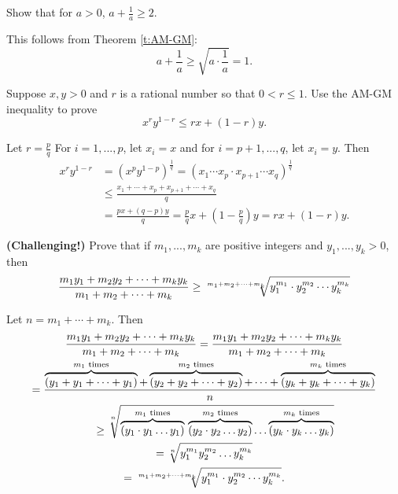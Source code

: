 \documentclass[11pt,dvipsnames]{book}
\numberwithin{figure}{section} %
\numberwithin{table}{section} %
\begin{document}
%
%

\begin{exercise} Show that for $a>0$, $a+\frac{1}{a}\geq 2$.
\begin{solution}
This follows from Theorem \ref{t:AM-GM}:
\[
a+\frac{1}{a} \geq \sqrt{a\cdot \frac{1}{a}}=1.
\]
\end{solution}
\end{exercise}

\begin{exercise} Suppose $x,y>0$ and $r$ is a rational number so that $0<r\leq 1$. Use the AM-GM inequality to prove
\[
x^{r}y^{1-r} \leq rx+(1-r)y.
\]
\begin{solution}
Let $r=\frac{p}{q}$ For $i=1,...,p$, let $x_i=x$ and for $i=p+1,...,q$, let $x_i=y$. Then
\begin{align*}
x^{r}y^{1-r}
& =(x^{p}y^{1-p})^{\frac{1}{q}}
=(x_{1}\cdots x_{p}\cdot x_{p+1}\cdots x_{q} )^{\frac{1}{q}}\\
& \leq \frac{x_{1}+\cdots + x_{p}+x_{p+1}+\cdots + x_{q}}{q} \\
& =\frac{px+(q-p)y}{q}=\frac{p}{q} x+(1-\frac{p}{q})y=rx+(1-r)y.
\end{align*}
\end{solution}

\end{exercise}



\begin{exercise} {\bf(Challenging!)} Prove that if $m_{1},...,m_{k}$ are positive integers and $y_{1},...,y_{k}>0$, then
\[
{m_1y_1+m_2y_2+\cdots+m_ky_k \over m_1+m_2+\cdots+m_k} \geq \sqrt[\large m_1+m_2+\cdots+m_k]{y_1^{m_1}\cdot y_2^{m_2}\cdots y_k^{m_k}}
\]

\begin{solution}
Let $n=m_{1}+\cdots + m_{k}$. Then
\begin{multline*}
{m_1y_1+m_2y_2+\cdots+m_ky_k \over m_1+m_2+\cdots+m_k}
=
{m_1y_1+m_2y_2+\cdots+m_ky_k \over m_1+m_2+\cdots+m_k} \\
=
\frac{\overbrace{(y_1+y_1+\dots+y_1)}^{m_1 \text{ times}}+\overbrace{(y_2+y_2+\dots+y_2)}^{m_2 \text{ times}}+\dots+\overbrace{(y_k+y_k+\dots+y_k)}^{m_k \text{ times}}}n \\
\qquad \geq  \sqrt[n]{\overbrace{(y_1 \cdot y_1 \dots y_1)}^{m_1 \text{ times}}\, \overbrace{(y_2 \cdot y_2 \dots y_2)}^{m_2 \text{ times}} \dots \overbrace{(y_k \cdot y_k \dots y_k)}^{m_k \text{ times}}}\\
=  \sqrt[n]{y_1^{m_1} y_2^{m_2} \dots y_k^{m_k}}\\
= \sqrt[\large m_1+m_2+\cdots+m_k]{y_1^{m_1}\cdot y_2^{m_2}\cdots y_k^{m_k}}.
\end{multline*}
\end{solution}
\end{exercise}
\end{document}
